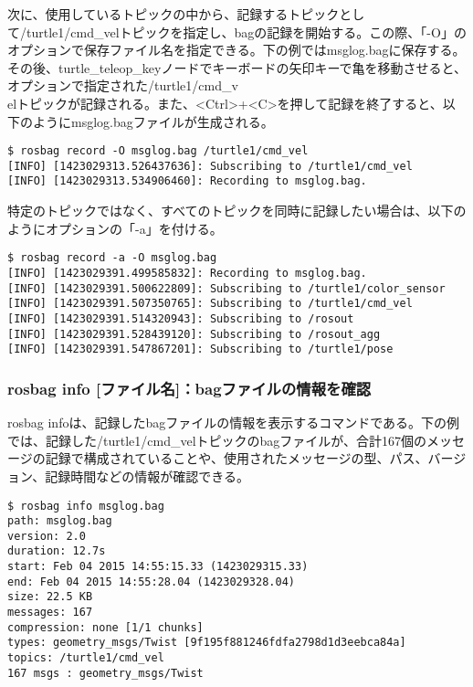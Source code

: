 次に、使用しているトピックの中から、記録するトピックとして/turtle1/cmd\_velトピックを指定し、bagの記録を開始する。この際、「-O」のオプションで保存ファイル名を指定できる。下の例ではmsglog.bagに保存する。その後、turtle\_teleop\_keyノードでキーボードの矢印キーで亀を移動させると、オプションで指定された/turtle1/cmd\_v\\elトピックが記録される。また、<Ctrl>+<C>を押して記録を終了すると、以下のようにmsglog.bagファイルが生成される。

\begin{lstlisting}[language=ROS]
$ rosbag record -O msglog.bag /turtle1/cmd_vel
[INFO] [1423029313.526437636]: Subscribing to /turtle1/cmd_vel
[INFO] [1423029313.534906460]: Recording to msglog.bag.
\end{lstlisting}

特定のトピックではなく、すべてのトピックを同時に記録したい場合は、以下のようにオプションの「-a」を付ける。

\begin{lstlisting}[language=ROS]
$ rosbag record -a -O msglog.bag
[INFO] [1423029391.499585832]: Recording to msglog.bag.
[INFO] [1423029391.500622809]: Subscribing to /turtle1/color_sensor
[INFO] [1423029391.507350765]: Subscribing to /turtle1/cmd_vel
[INFO] [1423029391.514320943]: Subscribing to /rosout
[INFO] [1423029391.528439120]: Subscribing to /rosout_agg
[INFO] [1423029391.547867201]: Subscribing to /turtle1/pose
\end{lstlisting}

\subsubsection{rosbag info [ファイル名]：bagファイルの情報を確認}

rosbag infoは、記録したbagファイルの情報を表示するコマンドである。下の例では、記録した/turtle1/cmd\_velトピックのbagファイルが、合計167個のメッセージの記録で構成されていることや、使用されたメッセージの型、パス、バージョン、記録時間などの情報が確認できる。

\begin{lstlisting}[language=ROS]
$ rosbag info msglog.bag
path: msglog.bag
version: 2.0
duration: 12.7s
start: Feb 04 2015 14:55:15.33 (1423029315.33)
end: Feb 04 2015 14:55:28.04 (1423029328.04)
size: 22.5 KB
messages: 167
compression: none [1/1 chunks]
types: geometry_msgs/Twist [9f195f881246fdfa2798d1d3eebca84a]
topics: /turtle1/cmd_vel
167 msgs : geometry_msgs/Twist
\end{lstlisting}

